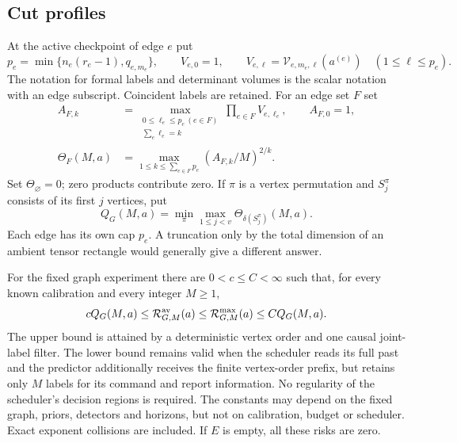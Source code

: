 \subsection{Cut profiles}
At the active checkpoint of edge $e$ put
\[
 p_e=\min\{n_e(r_e-1),q_{e,m_e}\},\qquad V_{e,0}=1,\qquad
 V_{e,\ell}=\mathcal V_{e,m_e,\ell}(a^{(e)})\quad(1\le\ell\le p_e).
\]
The notation for formal labels and determinant volumes is the scalar
notation with an edge subscript. Coincident labels are retained.
For an edge set $F$ set
\begin{equation}\label{eq:v25-cut-profile}
 \begin{split}
 A_{F,k}&=\max_{\substack{0\le\ell_e\le p_e\ (e\in F)\\
                              \sum_e\ell_e=k}}
                         \prod_{e\in F}V_{e,\ell_e},\qquad A_{F,0}=1,\\
 \Theta_F(M,a)&=\max_{1\le k\le\sum_{e\in F}p_e}
                                    (A_{F,k}/M)^{2/k}.
 \end{split}
\end{equation}
Set $\Theta_\varnothing=0$; zero products contribute zero. If $\pi$ is
a vertex permutation and $S_j^\pi$ consists of its first $j$ vertices,
put
\begin{equation}\label{eq:v25-width-profile}
 Q_G(M,a)=\min_\pi\max_{1\le j<v}
                            \Theta_{\delta(S_j^\pi)}(M,a).
\end{equation}
Each edge has its own cap $p_e$. A truncation only by the total dimension
of an ambient tensor rectangle would generally give a different answer.

\begin{theorem}\label{thm:v25-adaptive}
For the fixed graph experiment there are $0<c\le C<\infty$ such that,
for every known calibration and every integer $M\ge1$,
\begin{equation}\label{eq:v25-adaptive-law}
 cQ_G(M,a)\le\mathcal R^{\rm av}_{G,M}(a)
 \le\mathcal R^{\rm max}_{G,M}(a)\le CQ_G(M,a).
\end{equation}
The upper bound is attained by a deterministic vertex order and one
causal joint-label filter. The lower bound remains valid when the
scheduler reads its full past and the predictor additionally receives
the finite vertex-order prefix, but retains only $M$ labels for its
command and report information. No regularity of the scheduler's
decision regions is required. The constants may depend on the fixed
graph, priors, detectors and horizons, but not on calibration, budget
or scheduler. Exact exponent collisions are included. If $E$ is empty,
all these risks are zero.
\end{theorem}

